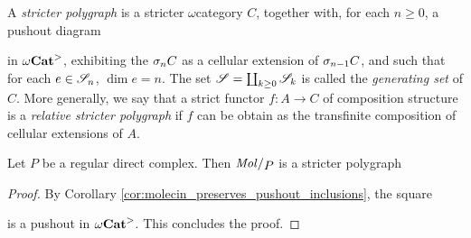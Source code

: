 \begin{dfn} 
    A \emph{stricter polygraph} is a stricter \( \omega \)\nbd category \( C \), together with, for each \( n \geq 0 \), a pushout diagram
    \begin{center}
    \end{center}
    in \( {\omega\mathbf{Cat}}^> \), exhibiting the \( \sigma_{n}C \) as a cellular extension of \( \sigma_{n - 1}C \), and such that for each \( e \in \mathscr{S}_n \), \( \dim e = n \).
    The set \( \mathscr{S} = \coprod_{k \geq 0} \mathscr{S}_k \) is called the \emph{generating set} of \( C \).
    More generally, we say that a strict functor \( f \colon A \to C \) of composition structure is a \emph{relative stricter polygraph} if \( f \) can be obtain as the transfinite composition of cellular extensions of \( A \).
\end{dfn}

\begin{lem} \label{lem:stricter_regular_complex_are_stricter_polygraph}
    Let \( P \) be a regular direct complex.
    Then \( \molecin{P} \) is a stricter polygraph
\end{lem}
\begin{proof}
    By Corollary \ref{cor:molecin_preserves_pushout_inclusions}, the square
    \begin{center}
    \end{center}
    is a pushout in \( {\omega\mathbf{Cat}}^> \).
    This concludes the proof.
\end{proof}

